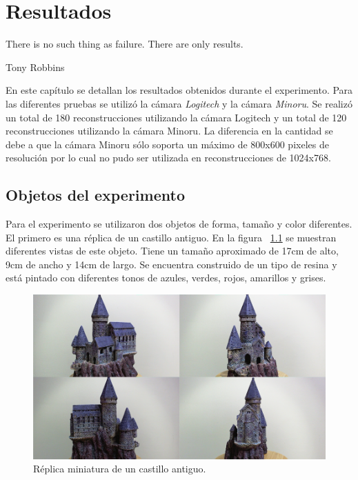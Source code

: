 \chapter{Resultados}
\label{chap:resultados}
\epigraph{There is no such thing as failure. There are only results.}{Tony Robbins}

En este cap\'{i}tulo se detallan los resultados obtenidos durante el experimento. Para las diferentes pruebas se utiliz\'{o} la c\'{a}mara \textit{Logitech} y la c\'{a}mara \textit{Minoru}. Se realiz\'{o} un total de 180 reconstrucciones utilizando la c\'{a}mara Logitech y un total de 120 reconstrucciones utilizando la c\'{a}mara Minoru. La diferencia en la cantidad se debe a que la c\'{a}mara Minoru s\'{o}lo soporta un m\'{a}ximo de 800x600 pixeles de resoluci\'{o}n por lo cual no pudo ser utilizada en reconstrucciones de 1024x768.

\section{Objetos del experimento}
Para el experimento se utilizaron dos objetos de forma, tama\~no y color diferentes. El primero es una r\'{e}plica de un castillo antiguo. En la figura ~\ref{fig:ResultsCastle} se muestran diferentes vistas de este objeto. Tiene un tama\~no aproximado de 17cm de alto, 9cm de ancho y 14cm de largo. Se encuentra construido de un tipo de resina y est\'{a} pintado con diferentes tonos de azules, verdes, rojos, amarillos y grises.


\begin{figure}[H]
\centering
\includegraphics[width=1.0\textwidth]{images/castle.png}
\caption[R\'{e}plica miniatura de un castillo antiguo.]%
{R\'{e}plica miniatura de un castillo antiguo.}
\label{fig:ResultsCastle}
\end{figure}


